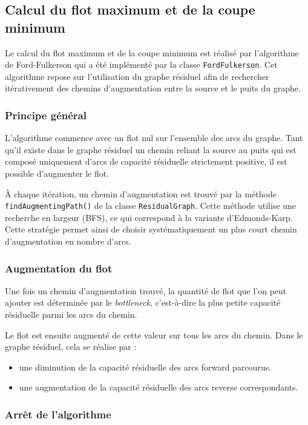 \documentclass[titlepage]{article}
\begin{document}
\subsection{Calcul du flot maximum et de la coupe minimum}

Le calcul du flot maximum et de la coupe minimum est réalisé par l'algorithme de Ford-Fulkerson qui a été implémenté par la classe \texttt{FordFulkerson}. Cet algorithme repose sur l'utilisation du graphe résiduel afin de rechercher itérativement des chemins d'augmentation entre la source et le puits du graphe.

\subsubsection{Principe général}

L'algorithme commence avec un flot nul sur l'ensemble des arcs du graphe. Tant qu'il existe dans le graphe résiduel un chemin reliant la source au puits qui est composé uniquement d'arcs de capacité résiduelle strictement positive, il est possible d'augmenter le flot.

À chaque itération, un chemin d'augmentation est trouvé par la méthode \texttt{findAugmentingPath()} de la classe \texttt{ResidualGraph}. Cette méthode utilise une recherche en largeur (BFS), ce qui correspond à la variante d'Edmonds-Karp. Cette stratégie permet ainsi de choisir systématiquement un plus court chemin d'augmentation en nombre d'arcs.

\subsubsection{Augmentation du flot}

Une fois un chemin d'augmentation trouvé, la quantité de flot que l'on peut ajouter est déterminée par le \emph{bottleneck}, c'est-à-dire la plus petite capacité résiduelle parmi les arcs du chemin.

Le flot est ensuite augmenté de cette valeur sur tous les arcs du chemin. Dans le graphe résiduel, cela se réalise par :
\begin{itemize}
    \item une diminution de la capacité résiduelle des arcs forward parcourus.
    \item une augmentation de la capacité résiduelle des arcs reverse correspondants.
\end{itemize}

\subsubsection{Arrêt de l'algorithme}
\end{document}
